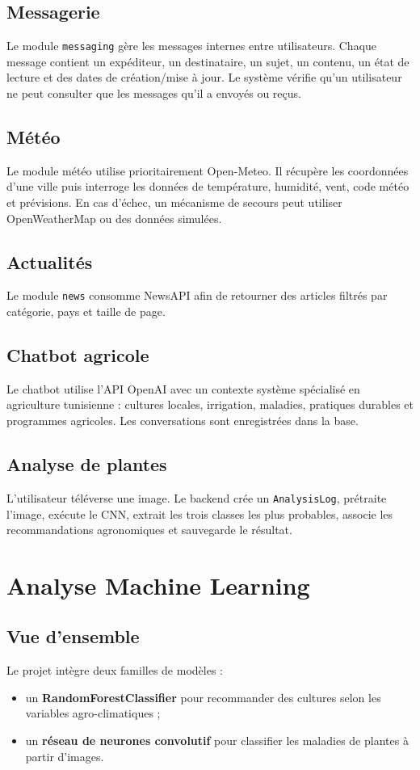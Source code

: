 \documentclass[12pt,a4paper]{report}
\begin{document}
\section{Messagerie}
Le module \texttt{messaging} gère les messages internes entre utilisateurs. Chaque message contient un expéditeur, un destinataire, un sujet, un contenu, un état de lecture et des dates de création/mise à jour. Le système vérifie qu'un utilisateur ne peut consulter que les messages qu'il a envoyés ou reçus.

\section{Météo}
Le module météo utilise prioritairement Open-Meteo. Il récupère les coordonnées d'une ville puis interroge les données de température, humidité, vent, code météo et prévisions. En cas d'échec, un mécanisme de secours peut utiliser OpenWeatherMap ou des données simulées.

\section{Actualités}
Le module \texttt{news} consomme NewsAPI afin de retourner des articles filtrés par catégorie, pays et taille de page.

\section{Chatbot agricole}
Le chatbot utilise l'API OpenAI avec un contexte système spécialisé en agriculture tunisienne : cultures locales, irrigation, maladies, pratiques durables et programmes agricoles. Les conversations sont enregistrées dans la base.

\section{Analyse de plantes}
L'utilisateur téléverse une image. Le backend crée un \texttt{AnalysisLog}, prétraite l'image, exécute le CNN, extrait les trois classes les plus probables, associe les recommandations agronomiques et sauvegarde le résultat.

\chapter{Analyse Machine Learning}

\section{Vue d'ensemble}
Le projet intègre deux familles de modèles :
\begin{itemize}[noitemsep]
  \item un \textbf{RandomForestClassifier} pour recommander des cultures selon les variables agro-climatiques ;
  \item un \textbf{réseau de neurones convolutif} pour classifier les maladies de plantes à partir d'images.
\end{itemize}
\end{document}
